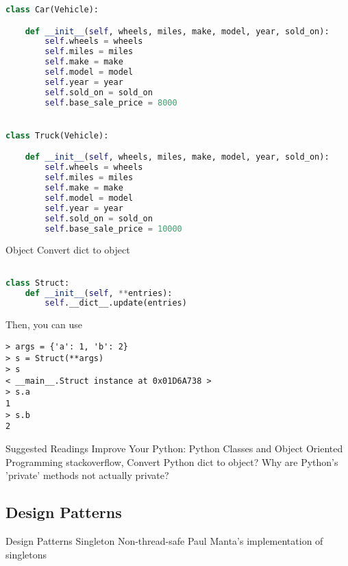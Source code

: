 \begin{lstlisting}[language=Python]
class Car(Vehicle):

    def __init__(self, wheels, miles, make, model, year, sold_on):
        self.wheels = wheels
        self.miles = miles
        self.make = make
        self.model = model
        self.year = year
        self.sold_on = sold_on
        self.base_sale_price = 8000


class Truck(Vehicle):

    def __init__(self, wheels, miles, make, model, year, sold_on):
        self.wheels = wheels
        self.miles = miles
        self.make = make
        self.model = model
        self.year = year
        self.sold_on = sold_on
        self.base_sale_price = 10000
\end{lstlisting}

Object
Convert dict to object

\begin{lstlisting}[language=Python]

class Struct:
    def __init__(self, **entries):
        self.__dict__.update(entries)
\end{lstlisting}

Then, you can use

\begin{lstlisting}
> args = {'a': 1, 'b': 2}
> s = Struct(**args)
> s
< __main__.Struct instance at 0x01D6A738 >
> s.a
1
> s.b
2
\end{lstlisting}

Suggested Readings
Improve Your Python: Python Classes and Object Oriented Programming
stackoverflow, Convert Python dict to object?
Why are Python's 'private' methods not actually private?

\subsection{Design Patterns}

Design Patterns
Singleton
Non-thread-safe
Paul Manta's implementation of singletons

